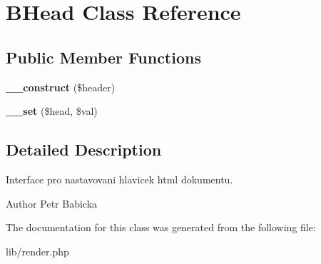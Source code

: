 \section{BHead Class Reference}
\label{class_b_head}
\subsection*{Public Member Functions}
\begin{DoxyCompactItemize}
\item 
{\bfseries \_\-\_\-construct} (\$header)\label{class_b_head_aedf929df290930085e0684fb961566f0}

\item 
{\bfseries \_\-\_\-set} (\$head, \$val)\label{class_b_head_ae63ba34e4d927b840ad722519cc8f071}

\end{DoxyCompactItemize}


\subsection{Detailed Description}
Interface pro nastavovani hlavicek html dokumentu. \begin{DoxyAuthor}{Author}
Petr Babicka 
\end{DoxyAuthor}


The documentation for this class was generated from the following file:\begin{DoxyCompactItemize}
\item 
lib/render.php\end{DoxyCompactItemize}
